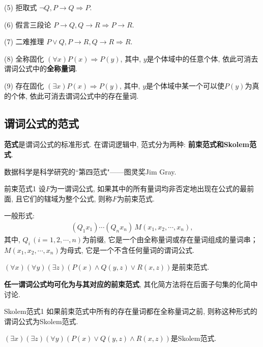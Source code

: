       (5) 拒取式           $ \neg Q,  P\rightarrow Q \Rightarrow  P$.

      (6) 假言三段论     $P\rightarrow Q,  Q\rightarrow R \Rightarrow P\rightarrow R$.

      (7) 二难推理       $ P\vee Q,  P\rightarrow R, Q\rightarrow R \Rightarrow  R$.

      (8) 全称固化        $(\forall x)P(x) \Rightarrow P(y)$, 其中, $y$是个体域中的任意个体, 依此可消去谓词公式中的\textbf{全称量词}.

      (9) 存在固化 $(\exists x)P(x) \Rightarrow P(y)$, 其中, $y$是个体域中某一个可以使$P(y)$为真的个体, 依此可消去谓词公式中的存在量词.
\subsection{谓词公式的范式}
\textbf{范式}是谓词公式的标准形式. 在谓词逻辑中, 范式分为两种: \textbf{前束范式和Skolem范式}.
\begin{remark}
  数据科学是科学研究的``第四范式"——图灵奖Jim Gray.
\end{remark}
\begin{mydef}{前束范式}{1}
设$F$为一谓词公式, 如果其中的所有量词均非否定地出现在公式的最前面, 且它们的辖域为整个公式, 则称$F$为前束范式.

一般形式:
\begin{align}
  (Q_1 x_1)\cdots (Q_n x_n)\,M(x_1, x_2,\cdots, x_n),
\end{align}
其中, $Q_i\,(i=1,2,\cdots,n)$为前缀, 它是一个由全称量词或存在量词组成的量词串； $M(x_1,x_2,\cdots,x_n)$为母式, 它是一个不含任何量词的谓词公式.
\end{mydef}

\begin{example}
  $(\forall x) (\forall y) (\exists z)(P(x)\wedge Q(y,z)\vee R(x,z))$是前束范式.
\end{example}

\textbf{任一谓词公式均可化为与其对应的前束范式}, 其化简方法将在后面子句集的化简中讨论.

\begin{mydef}{Skolem范式}{1}
如果前束范式中所有的存在量词都在全称量词之前, 则称这种形式的谓词公式为Skolem范式.
\end{mydef}

\begin{example}
  $(\exists x) (\exists  z) (\forall y)(P(x)\vee Q(y,z)\wedge R(x,z))$是Skolem范式.
\end{example}

